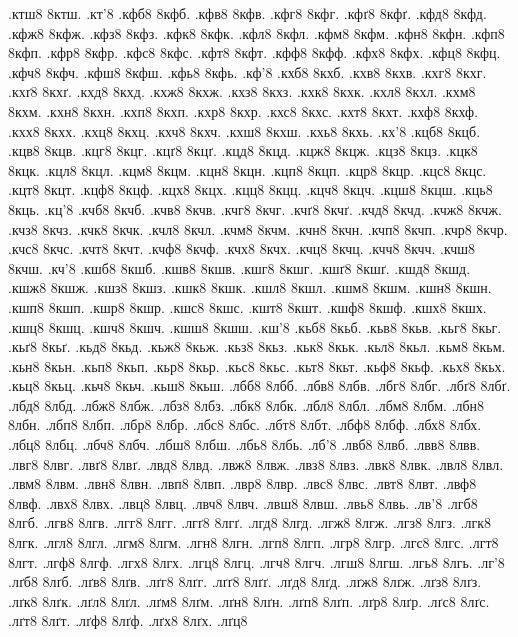 {.ктш8
8ктш.
.кт'8
.кфб8
8кфб.
.кфв8
8кфв.
.кфг8
8кфг.
.кфґ8
8кфґ.
.кфд8
8кфд.
.кфж8
8кфж.
.кфз8
8кфз.
.кфк8
8кфк.
.кфл8
8кфл.
.кфм8
8кфм.
.кфн8
8кфн.
.кфп8
8кфп.
.кфр8
8кфр.
.кфс8
8кфс.
.кфт8
8кфт.
.кфф8
8кфф.
.кфх8
8кфх.
.кфц8
8кфц.
.кфч8
8кфч.
.кфш8
8кфш.
.кфь8
8кфь.
.кф'8
.кхб8
8кхб.
.кхв8
8кхв.
.кхг8
8кхг.
.кхґ8
8кхґ.
.кхд8
8кхд.
.кхж8
8кхж.
.кхз8
8кхз.
.кхк8
8кхк.
.кхл8
8кхл.
.кхм8
8кхм.
.кхн8
8кхн.
.кхп8
8кхп.
.кхр8
8кхр.
.кхс8
8кхс.
.кхт8
8кхт.
.кхф8
8кхф.
.кхх8
8кхх.
.кхц8
8кхц.
.кхч8
8кхч.
.кхш8
8кхш.
.кхь8
8кхь.
.кх'8
.кцб8
8кцб.
.кцв8
8кцв.
.кцг8
8кцг.
.кцґ8
8кцґ.
.кцд8
8кцд.
.кцж8
8кцж.
.кцз8
8кцз.
.кцк8
8кцк.
.кцл8
8кцл.
.кцм8
8кцм.
.кцн8
8кцн.
.кцп8
8кцп.
.кцр8
8кцр.
.кцс8
8кцс.
.кцт8
8кцт.
.кцф8
8кцф.
.кцх8
8кцх.
.кцц8
8кцц.
.кцч8
8кцч.
.кцш8
8кцш.
.кць8
8кць.
.кц'8
.кчб8
8кчб.
.кчв8
8кчв.
.кчг8
8кчг.
.кчґ8
8кчґ.
.кчд8
8кчд.
.кчж8
8кчж.
.кчз8
8кчз.
.кчк8
8кчк.
.кчл8
8кчл.
.кчм8
8кчм.
.кчн8
8кчн.
.кчп8
8кчп.
.кчр8
8кчр.
.кчс8
8кчс.
.кчт8
8кчт.
.кчф8
8кчф.
.кчх8
8кчх.
.кчц8
8кчц.
.кчч8
8кчч.
.кчш8
8кчш.
.кч'8
.кшб8
8кшб.
.кшв8
8кшв.
.кшг8
8кшг.
.кшґ8
8кшґ.
.кшд8
8кшд.
.кшж8
8кшж.
.кшз8
8кшз.
.кшк8
8кшк.
.кшл8
8кшл.
.кшм8
8кшм.
.кшн8
8кшн.
.кшп8
8кшп.
.кшр8
8кшр.
.кшс8
8кшс.
.кшт8
8кшт.
.кшф8
8кшф.
.кшх8
8кшх.
.кшц8
8кшц.
.кшч8
8кшч.
.кшш8
8кшш.
.кш'8
.кьб8
8кьб.
.кьв8
8кьв.
.кьг8
8кьг.
.кьґ8
8кьґ.
.кьд8
8кьд.
.кьж8
8кьж.
.кьз8
8кьз.
.кьк8
8кьк.
.кьл8
8кьл.
.кьм8
8кьм.
.кьн8
8кьн.
.кьп8
8кьп.
.кьр8
8кьр.
.кьс8
8кьс.
.кьт8
8кьт.
.кьф8
8кьф.
.кьх8
8кьх.
.кьц8
8кьц.
.кьч8
8кьч.
.кьш8
8кьш.
.лбб8
8лбб.
.лбв8
8лбв.
.лбг8
8лбг.
.лбґ8
8лбґ.
.лбд8
8лбд.
.лбж8
8лбж.
.лбз8
8лбз.
.лбк8
8лбк.
.лбл8
8лбл.
.лбм8
8лбм.
.лбн8
8лбн.
.лбп8
8лбп.
.лбр8
8лбр.
.лбс8
8лбс.
.лбт8
8лбт.
.лбф8
8лбф.
.лбх8
8лбх.
.лбц8
8лбц.
.лбч8
8лбч.
.лбш8
8лбш.
.лбь8
8лбь.
.лб'8
.лвб8
8лвб.
.лвв8
8лвв.
.лвг8
8лвг.
.лвґ8
8лвґ.
.лвд8
8лвд.
.лвж8
8лвж.
.лвз8
8лвз.
.лвк8
8лвк.
.лвл8
8лвл.
.лвм8
8лвм.
.лвн8
8лвн.
.лвп8
8лвп.
.лвр8
8лвр.
.лвс8
8лвс.
.лвт8
8лвт.
.лвф8
8лвф.
.лвх8
8лвх.
.лвц8
8лвц.
.лвч8
8лвч.
.лвш8
8лвш.
.лвь8
8лвь.
.лв'8
.лгб8
8лгб.
.лгв8
8лгв.
.лгг8
8лгг.
.лгґ8
8лгґ.
.лгд8
8лгд.
.лгж8
8лгж.
.лгз8
8лгз.
.лгк8
8лгк.
.лгл8
8лгл.
.лгм8
8лгм.
.лгн8
8лгн.
.лгп8
8лгп.
.лгр8
8лгр.
.лгс8
8лгс.
.лгт8
8лгт.
.лгф8
8лгф.
.лгх8
8лгх.
.лгц8
8лгц.
.лгч8
8лгч.
.лгш8
8лгш.
.лгь8
8лгь.
.лг'8
.лґб8
8лґб.
.лґв8
8лґв.
.лґг8
8лґг.
.лґґ8
8лґґ.
.лґд8
8лґд.
.лґж8
8лґж.
.лґз8
8лґз.
.лґк8
8лґк.
.лґл8
8лґл.
.лґм8
8лґм.
.лґн8
8лґн.
.лґп8
8лґп.
.лґр8
8лґр.
.лґс8
8лґс.
.лґт8
8лґт.
.лґф8
8лґф.
.лґх8
8лґх.
.лґц8
}
